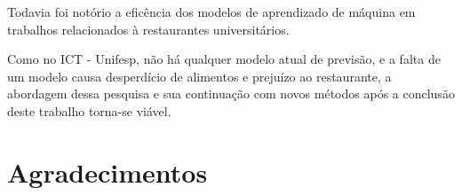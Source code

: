 \documentclass[	12pt, Times, openright, twoside, a4paper, english, brazil]{abntex2}
\begin{document}
         Todavia foi notório a eficência dos modelos de aprendizado de máquina em trabalhos relacionados à restaurantes universitários. 
        
         Como no ICT - Unifesp, não há qualquer modelo atual de previsão, e a falta de um modelo causa desperdício de alimentos e prejuízo ao restaurante, a abordagem dessa pesquisa e sua continuação com novos métodos após a conclusão deste trabalho torna-se viável.
  \chapter{Agradecimentos}







\end{document}

